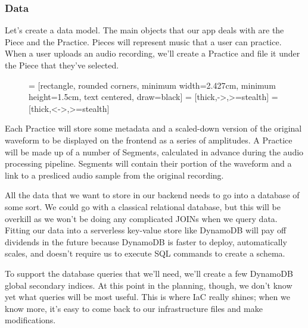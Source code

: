 \documentclass{article}
\begin{document}
\subsubsection{Data}

Let's create a data model.
The main objects that our app deals with are the Piece and the Practice.
Pieces will represent music that a user can practice.
When a user uploads an audio recording, we'll create a Practice and file it under the Piece that they've selected.

\begin{figure}[h]
  \centering
   = [rectangle, rounded corners, minimum width=2.427cm, minimum height=1.5cm, text centered, draw=black]
   = [thick,->,>=stealth]
   = [thick,<->,>=stealth]
  \label{fig:sdl}
\end{figure}

Each Practice will store some metadata and a scaled-down version of the original waveform to be displayed on the frontend as a series of amplitudes.
A Practice will be made up of a number of Segments, calculated in advance during the audio processing pipeline.
Segments will contain their portion of the waveform and a link to a presliced audio sample from the original recording.

All the data that we want to store in our backend needs to go into a database of some sort.
We could go with a classical relational database, but this will be overkill as we won't be doing any complicated JOINs when we query data.
Fitting our data into a serverless key-value store like DynamoDB will pay off dividends in the future because DynamoDB is faster to deploy, automatically scales, and doesn't require us to execute SQL commands to create a schema.

To support the database queries that we'll need, we'll create a few DynamoDB global secondary indices.
At this point in the planning, though, we don't know yet what queries will be most useful.
This is where IaC really shines; when we know more, it's easy to come back to our infrastructure files and make modifications.
\end{document}
